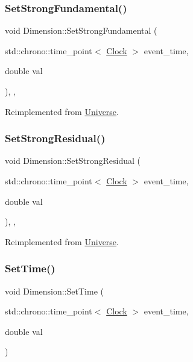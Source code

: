 \subsubsection{\texorpdfstring{Set\+Strong\+Fundamental()}{SetStrongFundamental()}}
{\footnotesize\ttfamily void Dimension\+::\+Set\+Strong\+Fundamental (\begin{DoxyParamCaption}\item[{std\+::chrono\+::time\+\_\+point$<$ \mbox{\hyperlink{universe_8h_a0ef8d951d1ca5ab3cfaf7ab4c7a6fd80}{Clock}} $>$}]{event\+\_\+time,  }\item[{double}]{val }\end{DoxyParamCaption})\hspace{0.3cm}{\ttfamily [inline]}, {\ttfamily [final]}, {\ttfamily [virtual]}}



Reimplemented from \mbox{\hyperlink{classUniverse_aafec97a231126b71c73ac1258609a284}{Universe}}.

\mbox{\label{classDimension_a9bd5480b1da689cd58bf61dac7169080}} 
\subsubsection{\texorpdfstring{Set\+Strong\+Residual()}{SetStrongResidual()}}
{\footnotesize\ttfamily void Dimension\+::\+Set\+Strong\+Residual (\begin{DoxyParamCaption}\item[{std\+::chrono\+::time\+\_\+point$<$ \mbox{\hyperlink{universe_8h_a0ef8d951d1ca5ab3cfaf7ab4c7a6fd80}{Clock}} $>$}]{event\+\_\+time,  }\item[{double}]{val }\end{DoxyParamCaption})\hspace{0.3cm}{\ttfamily [inline]}, {\ttfamily [final]}, {\ttfamily [virtual]}}



Reimplemented from \mbox{\hyperlink{classUniverse_a1b2d6197ddf3d613cc30bd04d22ed8b7}{Universe}}.

\mbox{\label{classDimension_a0558d45fe020ba1d1895e521a411decb}} 
\subsubsection{\texorpdfstring{Set\+Time()}{SetTime()}}
{\footnotesize\ttfamily void Dimension\+::\+Set\+Time (\begin{DoxyParamCaption}\item[{std\+::chrono\+::time\+\_\+point$<$ \mbox{\hyperlink{universe_8h_a0ef8d951d1ca5ab3cfaf7ab4c7a6fd80}{Clock}} $>$}]{event\+\_\+time,  }\item[{double}]{val }\end{DoxyParamCaption})}

